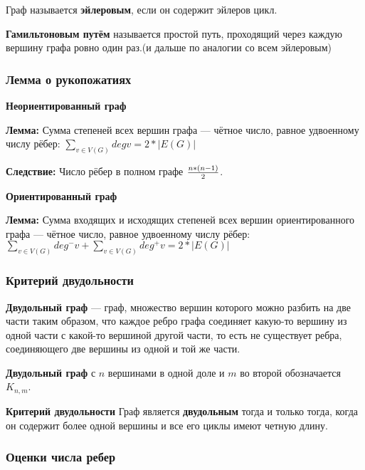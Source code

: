 \documentclass[12pt]{matmex-diploma}
\begin{document}
            Граф называется \textbf{эйлеровым}, если он содержит эйлеров цикл.
            
            \textbf{Гамильтоновым путём} называется простой путь, проходящий через каждую вершину графа ровно один раз.(и дальше по аналогии со всем эйлеровым)
            
        \subsubsection*{Лемма о рукопожатиях}
        
            \textbf{Неориентированный граф}
            
            \textbf{Лемма:}
            Сумма степеней всех вершин графа — чётное число, равное удвоенному числу рёбер:
            $\sum_{v \in V(G)} deg v = 2*|E(G)|$
            
            \textbf{Следствие:}
            Число рёбер в полном графе ${n*(n-1)} \over 2$.
            
            \textbf{Ориентированный граф}
            
            \textbf{Лемма:}
            Сумма входящих и исходящих степеней всех вершин ориентированного графа — чётное число, равное удвоенному числу рёбер: 
            $\sum_{v \in V(G)} deg^- v + \sum_{v \in V(G)} deg^+ v = 2*|E(G)|$
            
        \subsubsection*{Критерий двудольности}
        
            \textbf{Двудольный граф} — граф, множество вершин которого можно разбить на две части таким образом, что каждое ребро графа соединяет какую-то вершину из одной части с какой-то вершиной другой части, то есть не существует ребра, соединяющего две вершины из одной и той же части. 
            
            \textbf{Двудольный граф} с $n$ вершинами в одной доле и $m$ во второй обозначается $K_{n,m}$.
            
            \textbf{Критерий двудольности}
            Граф является \textbf{двудольным} тогда и только тогда, когда он содержит более одной вершины и все его циклы имеют четную длину.
            
        \subsubsection*{Оценки числа ребер}
            
\end{document}
